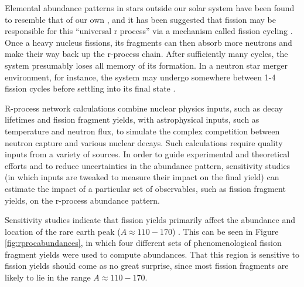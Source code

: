 Elemental abundance patterns in stars outside our solar system have been found to resemble that of our own \cite{Arnould2007}, and it has been suggested that fission may be responsible for this ``universal r process'' via a mechanism called fission cycling \cite{Beun2008}. Once a heavy nucleus fissions, its fragments can then absorb more neutrons and make their way back up the r-process chain. After sufficiently many cycles, the system presumably loses all memory of its formation. In a neutron star merger environment, for instance, the system may undergo somewhere between 1-4 fission cycles before settling into its final state \cite{Mendoza2015}.

R-process network calculations combine nuclear physics inputs, such as decay lifetimes and fission fragment yields, with astrophysical inputs, such as temperature and neutron flux, to simulate the complex competition between neutron capture and various nuclear decays. Such calculations require quality inputs from a variety of sources. In order to guide experimental and theoretical efforts and to reduce uncertainties in the abundance pattern, sensitivity studies (in which inputs are tweaked to measure their impact on the final yield) can estimate the impact of a particular set of observables, such as fission fragment yields, on the r-process abundance pattern.

Sensitivity studies indicate that fission yields primarily affect the abundance and location of the rare earth peak ($A\approx110-170$) \cite{Goriely2015a, Eichler2015}. This can be seen in Figure \ref{fig:rprocabundances}, in which four different sets of phenomenological fission fragment yields were used to compute abundances. That this region is sensitive to fission yields should come as no great surprise, since most fission fragments are likely to lie in the range $A\approx110-170$.

